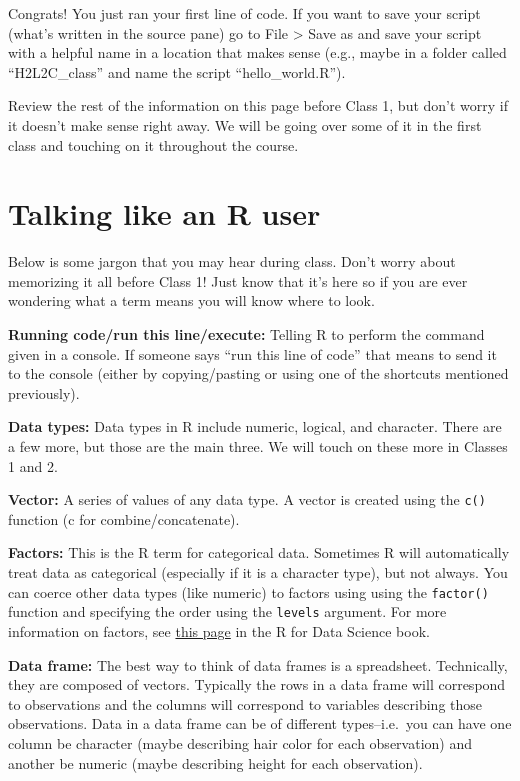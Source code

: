 \documentclass[
  letterpaper,
  DIV=11,
  numbers=noendperiod]{scrreprt}
\begin{document}
Congrats! You just ran your first line of code. If you want to save your
script (what's written in the source pane) go to File \textgreater{}
Save as and save your script with a helpful name in a location that
makes sense (e.g., maybe in a folder called ``H2L2C\_class'' and name
the script ``hello\_world.R'').

Review the rest of the information on this page before Class 1, but
don't worry if it doesn't make sense right away. We will be going over
some of it in the first class and touching on it throughout the course.

\section{Talking like an R user}\label{talking-like-an-r-user}

Below is some jargon that you may hear during class. Don't worry about
memorizing it all before Class 1! Just know that it's here so if you are
ever wondering what a term means you will know where to look.

\textbf{Running code/run this line/execute:} Telling R to perform the
command given in a console. If someone says ``run this line of code''
that means to send it to the console (either by copying/pasting or using
one of the shortcuts mentioned previously).

\textbf{Data types:} Data types in R include numeric, logical, and
character. There are a few more, but those are the main three. We will
touch on these more in Classes 1 and 2.

\textbf{Vector:} A series of values of any data type. A vector is
created using the \texttt{c()} function (c for combine/concatenate).

\textbf{Factors:} This is the R term for categorical data. Sometimes R
will automatically treat data as categorical (especially if it is a
character type), but not always. You can coerce other data types (like
numeric) to factors using using the \texttt{factor()} function and
specifying the order using the \texttt{levels} argument. For more
information on factors, see
\href{https://r4ds.hadley.nz/factors.html}{this page} in the R for Data
Science book.

\textbf{Data frame:} The best way to think of data frames is a
spreadsheet. Technically, they are composed of vectors. Typically the
rows in a data frame will correspond to observations and the columns
will correspond to variables describing those observations. Data in a
data frame can be of different types--i.e.~you can have one column be
character (maybe describing hair color for each observation) and another
be numeric (maybe describing height for each observation).
\end{document}
